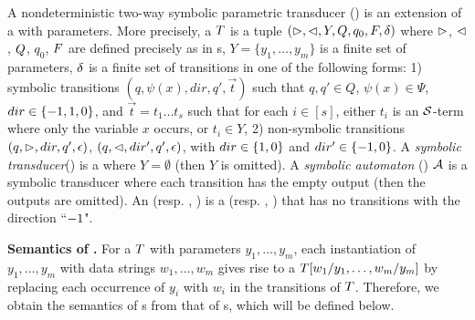 \begin{definition}
A nondeterministic two-way symbolic parametric transducer (\SSPT) is an extension of a \SST{} with parameters. More precisely,  a \SSPT{} $T$ is a tuple
$(\vartriangleright, \vartriangleleft, Y, Q, q_0, F, \delta)$ where
%
$\vartriangleright$, $\vartriangleleft$, $Q$, $q_0$, $F$ are defined precisely as in \FFA{}s, 
%
$Y=\{y_1,\ldots, y_m\}$ is a finite set of parameters, 
%
$\delta$ is a finite set of transitions in one of the following forms: 
1) symbolic transitions $(q, \psi(x), dir, q', \vec{t})$ such that $q,q' \in Q$, $\psi(x) \in \Psi$, $dir \in \{-1, 1, 0\}$, 
and $\vec{t} = t_1 \ldots t_s$ such that for each $i \in [s]$, either $t_i$ is an $\mathcal{S}$-term where only the variable $x$ occurs, or $t_i \in Y$,
%
2) non-symbolic transitions $(q, \vartriangleright, dir, q', \epsilon)$, $(q, \vartriangleleft, dir', q', \epsilon)$, with $dir \in \{1, 0\}$ and $dir' \in \{-1, 0\}$. 
A \emph{symbolic transducer}(\SST) is a \SSPT{} where $Y = \emptyset$ (then $Y$ is omitted).  A \emph{symbolic automaton} (\SSA) $\mathcal{A}$ is a symbolic transducer where each transition has the  empty output (then the outputs are omitted). An \SPT{} (resp. \ST, \SA) is a  \SSPT{}(resp. \SST, \SSA) that has no transitions with the direction ``$-1$". 
\end{definition}

\smallskip
\noindent
\textbf{Semantics of \SSPT{}.}
For a \SSPT{} $T$ with parameters $y_1,\ldots, y_m$,  each instantiation of $y_1,\ldots, y_m$ with data strings 
$w_1,\ldots, w_m$ gives rise to a \SST{} $T[w_1/y_1,\ldots, w_m/y_m]$ by replacing each occurrence of $y_i$ with $w_i$ in the transitions of $T$. 
Therefore, we obtain the semantics of \SSPT{}s from that of \SST{}s, which will be defined below. 

